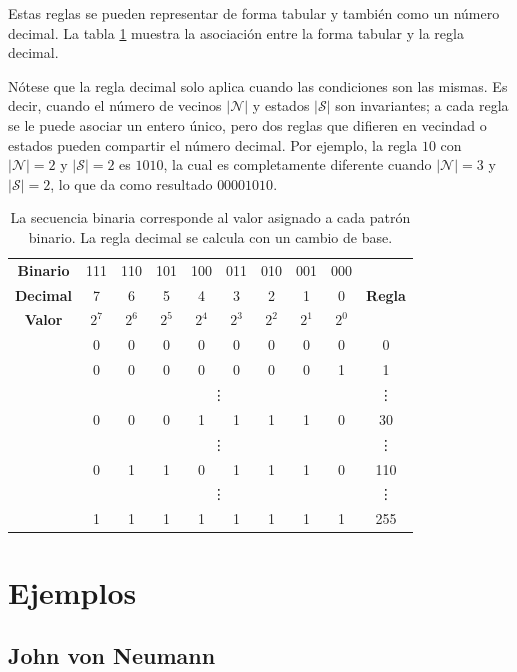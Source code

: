 Estas reglas se pueden representar de forma tabular y también como un número decimal. La tabla \ref{tab:ECA_rules} muestra la asociación entre la forma tabular y la regla decimal.

Nótese que la regla decimal solo aplica cuando las condiciones son las mismas. Es decir, cuando el número de vecinos $|\mathcal{N}|$ y estados $|\mathcal{S}|$ son invariantes; a cada regla se le puede asociar un entero único, pero dos reglas que difieren en vecindad o estados pueden compartir el número decimal. Por ejemplo, la regla $10$ con $|\mathcal{N}| = 2$ y $|\mathcal{S}| = 2$ es $1010$, la cual es completamente diferente cuando $|\mathcal{N}| = 3$ y $|\mathcal{S}| = 2$, lo que da como resultado $00001010$.

\begin{table}[!htbp]
	\centering
	\begin{tabular}{c | c c c c c c c c | c} 
		\textbf{Binario} &111 & 110 & 101 & 100 & 011 & 010 & 001 & 000 & \multirow{3}{*}{\textbf{Regla}} \\ 
		\textbf{Decimal} & 7 & 6 & 5 & 4 & 3 & 2 & 1 & 0 & \\ 
		\textbf{Valor} & $2^7$ & $2^6$ & $2^5$ & $2^4$ & $2^3$ & $2^2$ & $2^1$ & $2^0$ & \\ \hline
		& 0 &  0 &  0 &  0 &  0 &  0 &  0 &  0 & 0 \\
		& 0 &  0 &  0 &  0 &  0 &  0 &  0 &  1 & 1 \\
		& \multicolumn{8}{c|}{\vdots} & \vdots \\ 
		& 0 &  0 &  0 &  1 &  1 &  1 &  1 &  0 & 30 \\
		& \multicolumn{8}{c|}{\vdots} & \vdots \\ 
		& 0 &  1 &  1 &  0 &  1 &  1 &  1 &  0 & 110 \\
		& \multicolumn{8}{c|}{\vdots} & \vdots \\ 
		& 1 &  1 &  1 &  1 &  1 &  1 &  1 &  1 & 255 
	\end{tabular}
	\caption{La secuencia binaria corresponde al valor asignado a cada patrón binario. La regla decimal se calcula con un cambio de base.} 
	\label{tab:ECA_rules}
\end{table}

\section{Ejemplos}

\subsection{John von Neumann}

